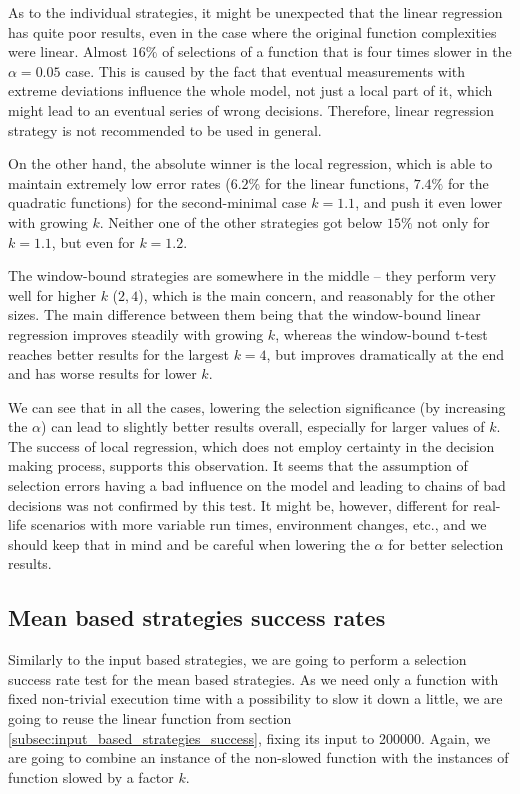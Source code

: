 As to the individual strategies, it might be unexpected that the linear regression has quite poor results, even in the case where the original function complexities were linear. Almost $16\%$ of selections of a function that is four times slower in the $\alpha = 0.05$ case. This is caused by the fact that eventual measurements with extreme deviations influence the whole model, not just a local part of it, which might lead to an eventual series of wrong decisions. Therefore, linear regression strategy is not recommended to be used in general.

On the other hand, the absolute winner is the local regression, which is able to maintain extremely low error rates ($6.2\%$ for the linear functions, $7.4\%$ for the quadratic functions) for the second-minimal case $k=1.1$, and push it even lower with growing $k$. Neither one of the other strategies got below $15\%$ not only for $k=1.1$, but even for $k=1.2$.

The window-bound strategies are somewhere in the middle -- they perform very well for higher $k$ ($2, 4$), which is the main concern, and reasonably for the other sizes. The main difference between them being that the window-bound linear regression improves steadily with growing $k$, whereas the window-bound t-test reaches better results for the largest $k=4$, but improves dramatically at the end and has worse results for lower $k$.

We can see that in all the cases, lowering the selection significance (by increasing the $\alpha$) can lead to slightly better results overall, especially for larger values of $k$. The success of local regression, which does not employ certainty in the decision making process, supports this observation. It seems that the assumption of selection errors having a bad influence on the model and leading to chains of bad decisions was not confirmed by this test. It might be, however, different for real-life scenarios with more variable run times, environment changes, etc., and we should keep that in mind and be careful when lowering the $\alpha$ for better selection results.

\subsection{Mean based strategies success rates}

Similarly to the input based strategies, we are going to perform a selection success rate test for the mean based strategies. As we need only a function with fixed non-trivial execution time with a possibility to slow it down a little, we are going to reuse the linear function from section \ref{subsec:input_based_strategies_success}, fixing its input to 200000. Again, we are going to combine an instance of the non-slowed function with the instances of function slowed by a factor $k$. 

